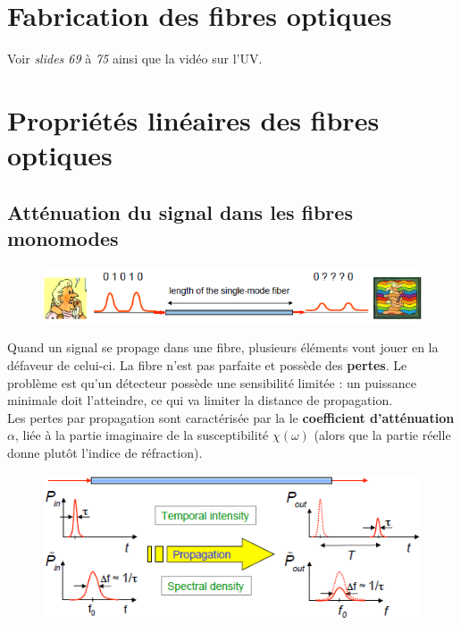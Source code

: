\section{Fabrication des fibres optiques}
Voir \textit{slides 69} à \textit{75} ainsi que la vidéo sur l'UV.


\newpage
\section{Propriétés linéaires des fibres optiques}
\subsection{Atténuation du signal dans les fibres monomodes}
	\begin{figure}
	\vspace{-5mm}
	\includegraphics[scale=0.6]{ch1/image29}
	\end{figure}
Quand un signal se propage dans une fibre, plusieurs éléments vont jouer en la défaveur de 
celui-ci. La fibre n'est pas parfaite et possède des \textbf{pertes}. Le problème est qu'un 
détecteur possède une sensibilité limitée : un puissance minimale doit l'atteindre, ce qui va
limiter la distance de propagation. \\

Les pertes par propagation sont caractérisée par la le \textbf{coefficient d'atténuation} 
$\alpha$, liée à la partie imaginaire de la susceptibilité $\chi(\omega)$ (alors que la partie
réelle donne plutôt l'indice de réfraction).\\

	\begin{figure}
	\vspace{-12mm}
	\includegraphics[scale=0.65]{ch1/image30}
	\end{figure}
	
